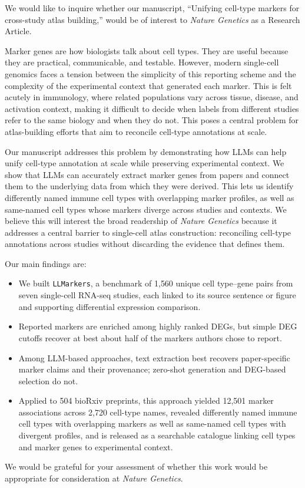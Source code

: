 We would like to inquire whether our manuscript, ``Unifying cell-type markers for cross-study atlas building,'' would be of interest to \textit{Nature Genetics} as a Research Article.

Marker genes are how biologists talk about cell types. They are useful because they are practical, communicable, and testable. However, modern single-cell genomics faces a tension between the simplicity of this reporting scheme and the complexity of the experimental context that generated each marker. This is felt acutely in immunology, where related populations vary across tissue, disease, and activation context, making it difficult to decide when labels from different studies refer to the same biology and when they do not. This poses a central problem for atlas-building efforts that aim to reconcile cell-type annotations at scale.

Our manuscript addresses this problem by demonstrating how LLMs can help unify cell-type annotation at scale while preserving experimental context. We show that LLMs can accurately extract marker genes from papers and connect them to the underlying data from which they were derived. This lets us identify differently named immune cell types with overlapping marker profiles, as well as same-named cell types whose markers diverge across studies and contexts. We believe this will interest the broad readership of \textit{Nature Genetics} because it addresses a central barrier to single-cell atlas construction: reconciling cell-type annotations across studies without discarding the evidence that defines them.

Our main findings are:
\begin{itemize}\setlength{\itemsep}{0pt}\setlength{\parsep}{0pt}
\item We built \texttt{LLMarkers}, a benchmark of 1{,}560 unique cell type--gene pairs from seven single-cell RNA-seq studies, each linked to its source sentence or figure and supporting differential expression comparison.
\item Reported markers are enriched among highly ranked DEGs, but simple DEG cutoffs recover at best about half of the markers authors chose to report.
\item Among LLM-based approaches, text extraction best recovers paper-specific marker claims and their provenance; zero-shot generation and DEG-based selection do not.
\item Applied to 504 bioRxiv preprints, this approach yielded 12{,}501 marker associations across 2{,}720 cell-type names, revealed differently named immune cell types with overlapping markers as well as same-named cell types with divergent profiles, and is released as a searchable catalogue linking cell types and marker genes to experimental context.
\end{itemize}

We would be grateful for your assessment of whether this work would be appropriate for consideration at \textit{Nature Genetics}.
